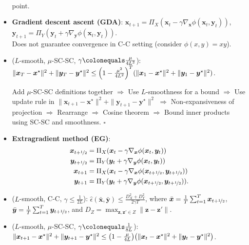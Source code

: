 \documentclass[8pt,a4paper]{extarticle}
\renewcommand{\proof}[1]{\begin{tcolorbox}#1 \hfill $\square$\end{tcolorbox}}
\newcommand{\lft}{\mathopen{}\mathclose\bgroup\left}
\newcommand{\rgt}{\aftergroup\egroup\right}
\renewcommand{\vec}[1]{\bm{#1}}
\newenvironment{topic}[1]
{\textbf{\sffamily \colorbox{black}{\rlap{\textbf{\textcolor{white}{#1}}}\hspace{\linewidth}\hspace{-2\fboxsep}}} \\ \vspace{0.2cm}}
{}
\begin{document}
\begin{multicols*}{2}
\begin{topic}{Min-max optimization}
\begin{itemize}
                  point.
            \item \textbf{Gradient descent ascent (GDA)}: $\vec{x}_{t+1} = \Pi_X(\vec{x}_t - \gamma \nabla_{\vec{x}} \phi(\vec{x}_t, \vec{y}_t))$, $\vec{y}_{t+1} = \Pi_Y(\vec{y}_t + \gamma \nabla_{\vec{y}} \phi(\vec{x}_t, \vec{y}_t))$. \\
                  Does not guarantee convergence in C-C setting (consider $\phi(x, y) = xy$).
            \item ($L$-smooth, $\mu$-SC-SC, $\gamma \colonequals \frac{\mu}{4L^2}$): $\| \vec{x}_T - \vec{x}^\star \|^2 + \| \vec{y}_T - \vec{y}^\star \|^2 \leq \lft( 1 - \frac{\mu^2}{4L^2} \rgt)^T (\| \vec{x}_1 - \vec{x}^\star \|^2 + \| \vec{y}_1 - \vec{y}^\star \|^2)$.
                  \proof{Add $\mu$-SC-SC definitions together $\Rightarrow$ Use $L$-smoothness for a bound $\Rightarrow$ Use update rule in $\| \vec{x}_{t+1} - \vec{x}^\star \|^2 + \| \vec{y}_{t+1} - \vec{y}^\star \|^2$ $\Rightarrow$ Non-expansiveness of projection $\Rightarrow$ Rearrange $\Rightarrow$ Cosine theorem $\Rightarrow$ Bound inner products using SC-SC and smoothness.}
            \item \textbf{Extragradient method (EG)}:
                  \begin{align*}
                      \vec{x}_{t+\nicefrac{1}{2}} & = \Pi_X(\vec{x}_t - \gamma \nabla_{\vec{x}} \phi(\vec{x}_t, \vec{y}_t))                                      \\
                      \vec{y}_{t+\nicefrac{1}{2}} & = \Pi_Y(\vec{y}_t + \gamma \nabla_{\vec{y}} \phi(\vec{x}_t, \vec{y}_t))                                      \\
                      \vec{x}_{t+1}               & = \Pi_X(\vec{x}_t - \gamma \nabla_{\vec{x}} \phi(\vec{x}_{t+\nicefrac{1}{2}}, \vec{y}_{t+\nicefrac{1}{2}}))  \\
                      \vec{y}_{t+1}               & = \Pi_Y(\vec{y}_t + \gamma \nabla_{\vec{y}} \phi(\vec{x}_{t+\nicefrac{1}{2}}, \vec{y}_{t+\nicefrac{1}{2}})).
                  \end{align*}
            \item ($L$-smooth, C-C, $\gamma \leq \frac{1}{2L}$): $\hat{\epsilon}(\bar{\vec{x}}, \bar{\vec{y}}) \leq \frac{D_X^2 + D_Y^2}{2 \gamma T}$, where $\bar{\vec{x}} = \frac{1}{T} \sum_{t=1}^{T} \vec{x}_{t+\nicefrac{1}{2}}$, $\bar{\vec{y}} = \frac{1}{T} \sum_{t=1}^{T} \vec{y}_{t+\nicefrac{1}{2}}$, and $D_Z = \max_{\vec{z}, \vec{z}' \in Z} \| \vec{z} - \vec{z}' \|$.
            \item ($L$-smooth, $\mu$-SC-SC, $\gamma \colonequals \frac{1}{8L}$): \\ $\| \vec{x}_{t+1} - \vec{x}^\star \|^2 + \| \vec{y}_{t+1} - \vec{y}^\star \|^2 \leq \lft( 1 - \frac{\mu}{4L} \rgt) \lft( \| \vec{x}_t - \vec{x}^\star \|^2 + \| \vec{y}_t - \vec{y}^\star \|^2 \rgt)$.

\end{itemize}
\end{topic}
\end{multicols*}
\end{document}
